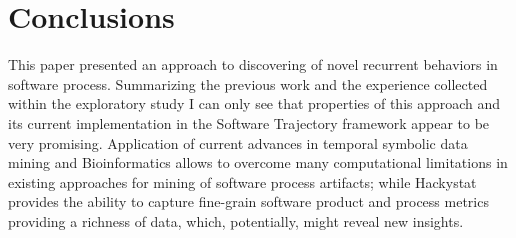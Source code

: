 \documentclass{sig-alternate}
\begin{document}
\section{Conclusions}
This paper presented an approach to discovering of novel recurrent behaviors in software process. Summarizing the previous work and the experience collected within the exploratory study I can only see that properties of this approach and its current implementation in the Software Trajectory framework appear to be very promising. Application of current advances in temporal symbolic data mining and Bioinformatics allows to overcome many computational limitations in existing approaches for mining of software process artifacts; while Hackystat provides the ability to capture fine-grain software product and process metrics providing a richness of data, which, potentially, might reveal new insights.


\end{document}
